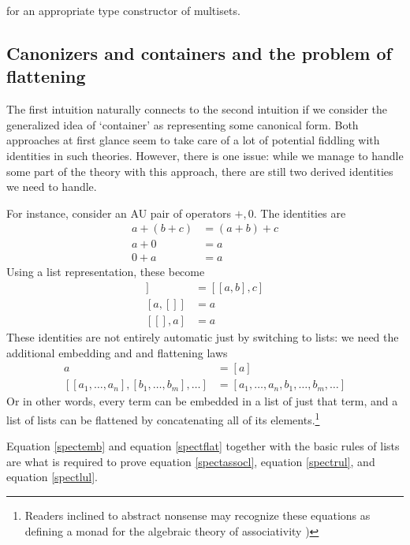 \documentclass[12pt,a4paper,twoside,openright]{report}
\numberwithin{equation}{chapter}		%
\numberwithin{figure}{chapter}			%
\numberwithin{table}{chapter}			%
\theoremstyle{definition}
\theoremstyle{plain}
\begin{document}
for an appropriate type constructor of multisets.


\subsection{Canonizers and containers and the problem of flattening}
The first intuition naturally connects to the second intuition if we consider the generalized idea of `container' as representing some canonical form. Both approaches at first glance seem to take care of a lot of potential fiddling with identities in such theories. However, there is one issue: while we manage to handle some part of the theory with this approach, there are still two derived identities we need to handle.

For instance, consider an AU pair of operators $+, 0$. The identities are
\begin{align}
	a + (b + c) &= (a + b) + c \label{spectassoc}\\
	a + 0 &= a \label{spectru} \\
	0 + a &= a \label{spectlu}
\end{align}
Using a list representation, these become
\begin{align}
	[a, [b, c]] &= [[a, b], c] \label{spectassocl}\\
	[a, []] &= a \label{spectrul}\\
	[[], a] &= a \label{spectlul}
\end{align}
These identities are not entirely automatic just by switching to lists: we need the additional embedding and and flattening laws
\begin{align}
	a &= [a] \label{spectemb} \\
	[[a_1, \ldots, a_n], [b_1, \ldots, b_m], \ldots] &= [a_1, \ldots, a_n, b_1, \ldots, b_m, \ldots] \label{spectflat}
\end{align}
Or in other words, every term can be embedded in a list of just that term, and a list of lists can be flattened by concatenating all of its elements.\footnote{Readers inclined to abstract nonsense may recognize these equations as defining a monad for the algebraic theory of associativity \cite{voutas_basic_2012})}

Equation \ref{spectemb} and equation \ref{spectflat} together with the basic rules of lists are what is required to prove equation \ref{spectassocl}, equation \ref{spectrul}, and equation \ref{spectlul}.
\end{document}
